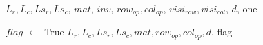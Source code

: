 \begin{algorithm}
\begin{algorithmic}[1]
    	\State \Return $L_{r}, L_{c}, Ls_{r}, Ls_{c}$, $mat$, $inv$, $row_{op}, col_{op}$, $visi_{row}, visi_{col}$, $d$, one
	\EndFunction
    
	    \State $flag$ $\leftarrow$ True
	    \State \Return
    \EndIf
\EndWhile
\State \Return $L_{r}, L_{c}, Ls_{r}, Ls_{c}, mat, row_{op}, col_{op}, d$, flag
\end{algorithmic}
\end{algorithm}